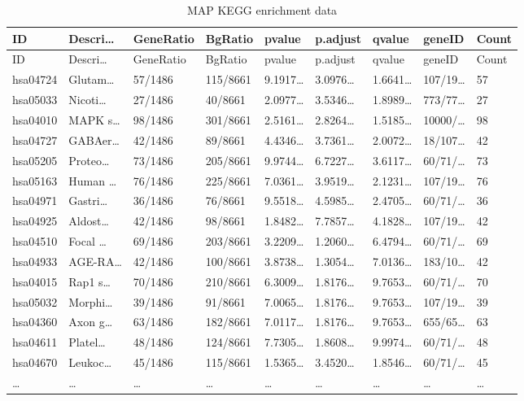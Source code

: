\documentclass[
]{article}
\begin{document}
\begin{longtable}[]{@{}lllllllll@{}}
\caption{\label{tab:MAP-KEGG-enrichment-data}MAP KEGG enrichment data}\tabularnewline
\toprule
ID & Descri\ldots{} & GeneRatio & BgRatio & pvalue & p.adjust & qvalue & geneID & Count\tabularnewline
\midrule
\endfirsthead
\toprule
ID & Descri\ldots{} & GeneRatio & BgRatio & pvalue & p.adjust & qvalue & geneID & Count\tabularnewline
\midrule
\endhead
hsa04724 & Glutam\ldots{} & 57/1486 & 115/8661 & 9.1917\ldots{} & 3.0976\ldots{} & 1.6641\ldots{} & 107/19\ldots{} & 57\tabularnewline
hsa05033 & Nicoti\ldots{} & 27/1486 & 40/8661 & 2.0977\ldots{} & 3.5346\ldots{} & 1.8989\ldots{} & 773/77\ldots{} & 27\tabularnewline
hsa04010 & MAPK s\ldots{} & 98/1486 & 301/8661 & 2.5161\ldots{} & 2.8264\ldots{} & 1.5185\ldots{} & 10000/\ldots{} & 98\tabularnewline
hsa04727 & GABAer\ldots{} & 42/1486 & 89/8661 & 4.4346\ldots{} & 3.7361\ldots{} & 2.0072\ldots{} & 18/107\ldots{} & 42\tabularnewline
hsa05205 & Proteo\ldots{} & 73/1486 & 205/8661 & 9.9744\ldots{} & 6.7227\ldots{} & 3.6117\ldots{} & 60/71/\ldots{} & 73\tabularnewline
hsa05163 & Human \ldots{} & 76/1486 & 225/8661 & 7.0361\ldots{} & 3.9519\ldots{} & 2.1231\ldots{} & 107/19\ldots{} & 76\tabularnewline
hsa04971 & Gastri\ldots{} & 36/1486 & 76/8661 & 9.5518\ldots{} & 4.5985\ldots{} & 2.4705\ldots{} & 60/71/\ldots{} & 36\tabularnewline
hsa04925 & Aldost\ldots{} & 42/1486 & 98/8661 & 1.8482\ldots{} & 7.7857\ldots{} & 4.1828\ldots{} & 107/19\ldots{} & 42\tabularnewline
hsa04510 & Focal \ldots{} & 69/1486 & 203/8661 & 3.2209\ldots{} & 1.2060\ldots{} & 6.4794\ldots{} & 60/71/\ldots{} & 69\tabularnewline
hsa04933 & AGE-RA\ldots{} & 42/1486 & 100/8661 & 3.8738\ldots{} & 1.3054\ldots{} & 7.0136\ldots{} & 183/10\ldots{} & 42\tabularnewline
hsa04015 & Rap1 s\ldots{} & 70/1486 & 210/8661 & 6.3009\ldots{} & 1.8176\ldots{} & 9.7653\ldots{} & 60/71/\ldots{} & 70\tabularnewline
hsa05032 & Morphi\ldots{} & 39/1486 & 91/8661 & 7.0065\ldots{} & 1.8176\ldots{} & 9.7653\ldots{} & 107/19\ldots{} & 39\tabularnewline
hsa04360 & Axon g\ldots{} & 63/1486 & 182/8661 & 7.0117\ldots{} & 1.8176\ldots{} & 9.7653\ldots{} & 655/65\ldots{} & 63\tabularnewline
hsa04611 & Platel\ldots{} & 48/1486 & 124/8661 & 7.7305\ldots{} & 1.8608\ldots{} & 9.9974\ldots{} & 60/71/\ldots{} & 48\tabularnewline
hsa04670 & Leukoc\ldots{} & 45/1486 & 115/8661 & 1.5365\ldots{} & 3.4520\ldots{} & 1.8546\ldots{} & 60/71/\ldots{} & 45\tabularnewline
\ldots{} & \ldots{} & \ldots{} & \ldots{} & \ldots{} & \ldots{} & \ldots{} & \ldots{} & \ldots{}\tabularnewline
\bottomrule
\end{longtable}
\end{document}
